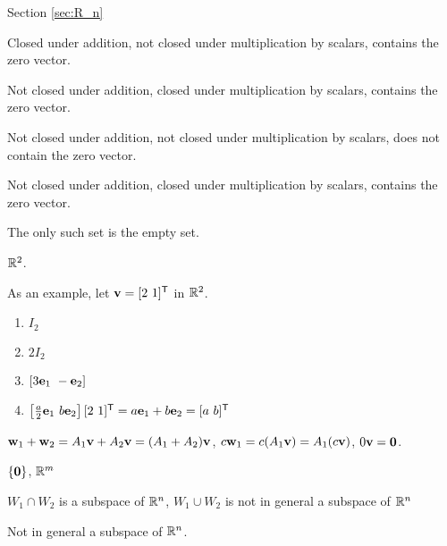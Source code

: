 \begin{multicols}{2}
\begin{enumerate}[label=(\alph*), leftmargin=1\parindent]
\end{enumerate}


\oee

\hspace{-0.25in} Section \ref{sec:R_n}

\obe

\item 
\ba
\item Closed under addition, not closed under multiplication by scalars, contains the zero vector. 

\item Not closed under addition, closed under multiplication by scalars, contains the zero vector. 

\item Not closed under addition, not closed under multiplication by scalars, does not contain the zero vector. 

\item Not closed under addition, closed under multiplication by scalars, contains the zero vector. 

\ea

\item The only such set is the empty set. 

\item $\mathbb{R}^2$. 

\item 
\ba
\item As an example, let $\vv = [2 \ 1]^{\tr}$ in $\mathbb{R}^2$. 
	\begin{enumerate}[label=\roman*.]
	\item $I_2$
	\item $2I_2$
	\item $[3\mathbf{e}_1 \ -\mathbf{e}_2]$
	\item $\left[ \frac{a}{2}\ve_1 \ b\ve_2\right] [2 \ 1]^{\tr} = a\ve_1 + b\ve_2 = [a \ b]^{\tr}$
	\end{enumerate}
	
\item $\mathbf{w}_1 + \mathbf{w}_2 = A_1 \mathbf{v} + A_2 \mathbf{v} = (A_1+A_2) \mathbf{v}$, $c\mathbf{w}_1 = c(A_1\mathbf{v}) = A_1(c\mathbf{v})$, 
$0\mathbf{v} = \mathbf{0}$.

\item $\{\mathbf{0}\}$, $\mathbb{R}^m$

\ea

\item $W_1 \cap W_2$ is a subspace of $\mathbb{R}^n$, $W_1 \cup W_2$ is not in general a subspace of $\mathbb{R}^n$

\item Not in general a subspace of $\mathbb{R}^n$. 


\end{multicols}
